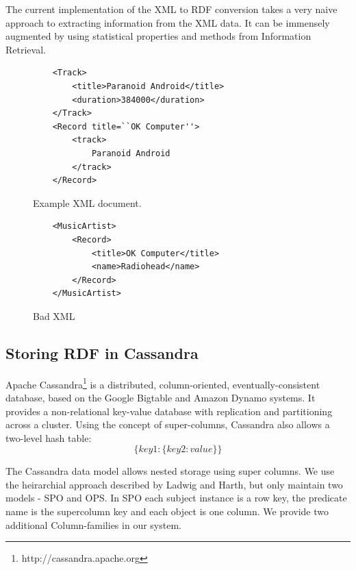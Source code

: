 \documentclass[journal]{IEEEtran}
\begin{document}
The current implementation of the XML to RDF conversion takes a very naive
approach to extracting information from the XML data. It can be immensely
augmented by using statistical properties and methods from Information
Retrieval.

\begin{figure}
    \caption{Example XML document.}
    \label{ex:xml-rec}
    \begin{verbatim}
    <Track>
        <title>Paranoid Android</title>
        <duration>384000</duration>
    </Track>
    <Record title=``OK Computer''>
        <track>
            Paranoid Android
        </track>
    </Record>
    \end{verbatim}
\end{figure}

\begin{figure}
    \caption{Bad XML}
    \label{ex:xml-bad}
    \begin{verbatim}
    <MusicArtist>
        <Record>
            <title>OK Computer</title>
            <name>Radiohead</name>
        </Record>
    </MusicArtist>
    \end{verbatim}
\end{figure}

\subsection{Storing RDF in Cassandra}

Apache Cassandra\footnote{http://cassandra.apache.org} is a distributed,
column-oriented, eventually-consistent database, based on the Google
Bigtable\cite{Chang06bigtable:a} and Amazon
Dynamo\cite{Hastorun07dynamo} systems. It provides a non-relational
key-value database with replication and partitioning across a cluster. Using
the concept of super-columns, Cassandra also allows a two-level hash table:
$$\{ key1 : \{ key2 : value \} \}$$

The Cassandra data model allows nested storage using super columns. We use the
heirarchial approach described by Ladwig and Harth\cite{ladwig:11}, but only
maintain two models - SPO and OPS. In SPO each subject instance is a row key,
the predicate name is the supercolumn key and each object is one column. We
provide two additional Column-families in our system.
\end{document}
